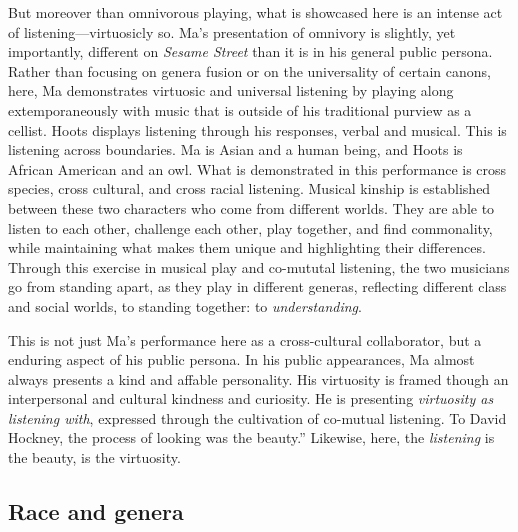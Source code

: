 \documentclass[12pt,letterpaper]{article}
\newcommand{\ses}{\textit{Sesame Street }}
\begin{document}
	But moreover than omnivorous playing, what is showcased here is an 
	intense
	act of listening---virtuosicly so. Ma's presentation of omnivory is 
	slightly, yet importantly, different on \ses than it is in his general
	public persona. Rather than focusing
	on genera fusion or on the universality of certain canons, here, Ma 
	demonstrates virtuosic and universal listening by playing 
	along extemporaneously with music that is outside of his traditional 
	purview as a 
	cellist. Hoots displays listening through his responses, verbal and 
	musical. This is listening across boundaries. Ma is Asian and a human 
	being, and Hoots is African American and an owl. What is demonstrated 
	in this performance is cross species, cross cultural, and cross racial 
	listening. Musical kinship is established between these two characters 
	who come from different worlds. They are able to listen to each other, 
	challenge each other, play together, and find commonality, while 
	maintaining what makes them unique and highlighting their differences. 
	Through this exercise in musical play and co-mututal listening, the two
	musicians go from standing apart, as they play in different generas, 
	reflecting different class and social worlds, to standing together: to 
	\textit{understanding}.

	This is not just Ma's performance here as a cross-cultural collaborator,
	but a enduring aspect of his public persona. In his public appearances,
	Ma almost always presents a kind and affable personality. His virtuosity
	is framed though an interpersonal and cultural kindness and curiosity. 
	He is presenting \textit{virtuosity as listening with}, expressed
	through the
	cultivation of co-mutual listening.
	To David Hockney, the process of looking was the 
	beauty.''\autocite[100]{Odell} Likewise, here, the \textit{listening} is
	the beauty, is the virtuosity.  


	\subsection*{Race and genera}
\end{document}
